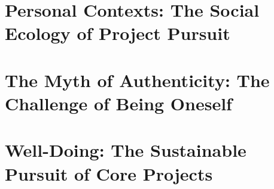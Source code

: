 \documentclass{article}
\numberwithin{equation}{section}
\begin{document}
\section{Personal Contexts: The Social Ecology of Project Pursuit}


\section{The Myth of Authenticity: The Challenge of Being Oneself}


\section{Well-Doing: The Sustainable Pursuit of Core Projects}


\printbibliography[heading=bibintoc]
	
\end{document}
